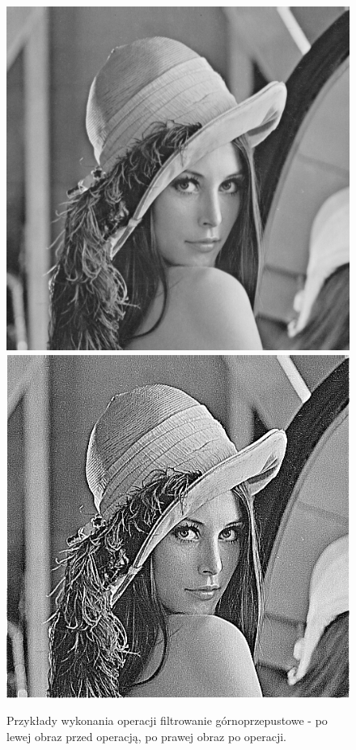\documentclass{article}
\begin{document}
\begin{figure}[!htb]
\includegraphics[scale=0.2]{img/lena_8bit.png}  
\includegraphics[scale=0.2]{img/_Filtr_Gornoprzepustowy_lena_8bit.png} 
\caption{Przykłady wykonania operacji filtrowanie górnoprzepustowe - po lewej obraz przed operacją, po prawej obraz po operacji. }
\end{figure}
\end{document}
